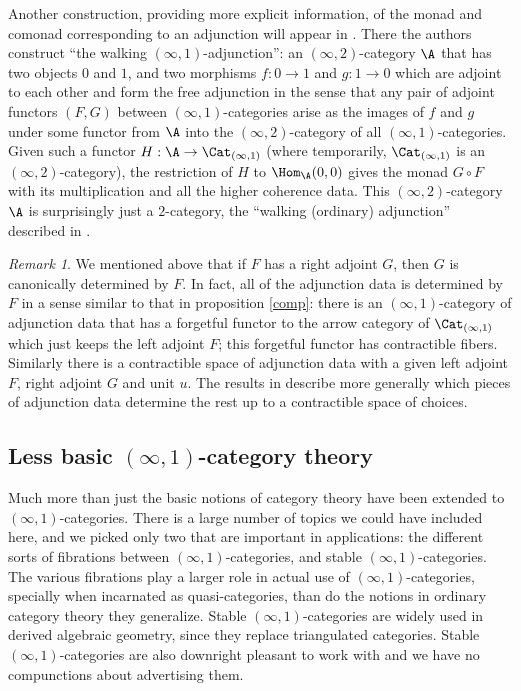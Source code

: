 \documentclass[12pt]{amsart}
\theoremstyle{definition} \newtheorem{definition}[theorem]{Definition}
\theoremstyle{remark} \newtheorem{remark}[theorem]{Remark}
\numberwithin{equation}{section}
\newcommand{\oo}{\infty}
\newcommand{\io}{$(\oo,1)$}
\newcommand{\Catio}{\Cat_{(\oo,1)}}
\begin{document}
Another construction, providing more explicit information, of the
monad and comonad corresponding to an adjunction will appear in
\cite{Adjunctions}. There the authors construct ``the walking
\io-adjunction'': an $(\oo,2)$-category $\A$ that has two objects $0$
and $1$, and two morphisms $f : 0 \to 1$ and $g:1 \to 0$ which are
adjoint to each other and form the free adjunction in the sense that
any pair of adjoint functors $(F,G)$ between \io-categories arise as
the images of $f$ and $g$ under some functor from $\A$ into the
$(\oo,2)$-category of all \io-categories. Given such a functor $H : \A
\to \Catio$ (where temporarily, $\Catio$ is an $(\oo,2)$-category),
the restriction of $H$ to $\Hom_\A(0,0)$ gives the monad $G \circ F$
with its multiplication and all the higher coherence data. This
$(\oo,2)$-category $\A$ is surprisingly just a $2$-category, the
``walking (ordinary) adjunction'' described in \cite{FreeAdj}.

\begin{remark}
  We mentioned above that if $F$ has a right adjoint $G$, then $G$ is
  canonically determined by $F$. In fact, all of the adjunction data
  is determined by $F$ in a sense similar to that in proposition
  \ref{comp}: there is an \io-category of adjunction data that has a
  forgetful functor to the arrow category of $\Catio$ which just keeps
  the left adjoint $F$; this forgetful functor has contractible
  fibers.  Similarly there is a contractible space of adjunction data
  with a given left adjoint $F$, right adjoint $G$ and unit $u$. The
  results in \cite{Adjunctions} describe more generally which pieces
  of adjunction data determine the rest up to a contractible space of
  choices.
\end{remark}

\subsection{Less basic \io-category theory}

Much more than just the basic notions of category theory have been
extended to \io-categories. There is a large number of topics we could
have included here, and we picked only two that are important in
applications: the different sorts of fibrations between
\io-categories, and stable \io-categories. The various fibrations play
a larger role in actual use of \io-categories, specially when
incarnated as quasi-categories, than do the notions in ordinary
category theory they generalize. Stable \io-categories are widely used
in derived algebraic geometry, since they replace triangulated
categories. Stable \io-categories are also downright pleasant to work
with and we have no compunctions about advertising them.
\end{document}

